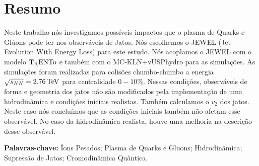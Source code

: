 \chapter*{Resumo}

Neste trabalho n\'{o}s investigamos poss\'{i}veis impactos que o plasma de Quarks e Gl\'{u}ons pode ter nos observ\'{a}veis de Jatos. N\'{o}s escolhemos o JEWEL (Jet Evolution With Energy Loss) para este estudo. N\'{o}s acoplamos o JEWEL com o modelo $\rm T_RENTo$ e tamb\'{e}m com o MC-KLN+vUSPhydro para as simula\c{c}\~{o}es. As simulaç\~{o}es foram realizadas para colis\~{o}es chumbo-chumbo a energia $\sqrt{s_{NN}} = 2.76 \, {\rm TeV}$ para centralidade $0-10\%$. Nessas condi\c{c}\~{o}es, observ\'{a}veis de forma e geometria dos jatos n\~{a}o s\~{a}o modificados pela implementa\c{c}\~{a}o de uma hidrodin\^{a}mica e condi\c{c}\~{o}es iniciais realistas. Tamb\'{e}m calculamos o $v_2$ dos jatos. Neste caso n\'{o}s conclu\'{i}mos que as condi\c{c}\~{o}es iniciais tamb\'{e}m n\~{a}o afetam esse observ\'{a}vel. No caso da hidrodin\^{a}mica realista, houve uma melhoria na descri\c{c}\~{a}o desse observ\'{a}vel.

\noindent\textbf{Palavras-chave:} \'{I}ons Pesados; Plasma de Quarks e Gluons; Hidrodin\^{a}mica; Supress\~{a}o de Jatos; Cromodin\^{a}mica Qu\^{a}ntica.